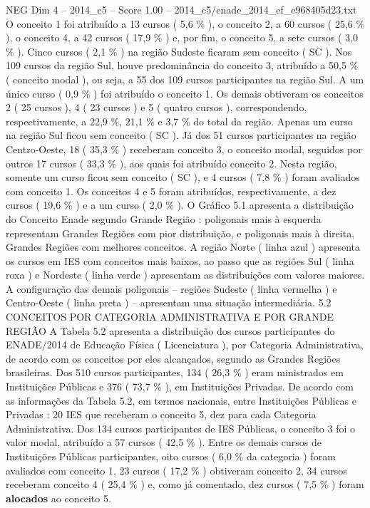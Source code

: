 \begin{textsample}{NEG Dim 4 – 2014\_c5 – Score 1.00 – 2014\_c5/enade\_2014\_ef\_e968405d23.txt}
O conceito 1 foi atribuído a 13 cursos ( 5,6 \% ), o conceito 2, a 60 cursos ( 25,6 \% ), o conceito 4, a 42 cursos ( 17,9 \% ) e, por fim, o conceito 5, a sete cursos ( 3,0 \% ).
Cinco cursos ( 2,1 \% ) na região Sudeste ficaram sem conceito ( SC ).
Nos 109 cursos da região Sul, houve predominância do conceito 3, atribuído a 50,5 \% ( conceito modal ), ou seja, a 55 dos 109 cursos participantes na região Sul.
A um único curso ( 0,9 \% ) foi atribuído o conceito 1.
Os demais obtiveram os conceitos 2 ( 25 cursos ), 4 ( 23 cursos ) e 5 ( quatro cursos ), correspondendo, respectivamente, a 22,9 \%, 21,1 \% e 3,7 \% do total da região.
Apenas um curso na região Sul ficou sem conceito ( SC ).
Já dos 51 cursos participantes na região Centro-Oeste, 18 ( 35,3 \% ) receberam conceito 3, o conceito modal, seguidos por outros 17 cursos ( 33,3 \% ), aos quais foi atribuído conceito 2.
Nesta região, somente um curso ficou sem conceito ( SC ), e 4 cursos ( 7,8 \% ) foram avaliados com conceito 1.
Os conceitos 4 e 5 foram atribuídos, respectivamente, a dez cursos ( 19,6 \% ) e a um curso ( 2,0 \% ).
O Gráfico 5.1 apresenta a distribuição do Conceito Enade segundo Grande Região : poligonais mais à esquerda representam Grandes Regiões com pior distribuição, e poligonais mais à direita, Grandes Regiões com melhores conceitos.
A região Norte ( linha azul ) apresenta os cursos em IES com conceitos mais baixos, ao passo que as regiões Sul ( linha roxa ) e Nordeste ( linha verde ) apresentam as distribuições com valores maiores.
A configuração das demais poligonais – regiões Sudeste ( linha vermelha ) e Centro-Oeste ( linha preta ) – apresentam uma situação intermediária. 5.2 CONCEITOS POR CATEGORIA ADMINISTRATIVA E POR GRANDE REGIÃO A Tabela 5.2 apresenta a distribuição dos cursos participantes do ENADE/2014 de Educação Física ( Licenciatura ), por Categoria Administrativa, de acordo com os conceitos por eles alcançados, segundo as Grandes Regiões brasileiras.
Dos 510 cursos participantes, 134 ( 26,3 \% ) eram ministrados em Instituições Públicas e 376 ( 73,7 \% ), em Instituições Privadas.
De acordo com as informações da Tabela 5.2, em termos nacionais, entre Instituições Públicas e Privadas : 20 IES que receberam o conceito 5, dez para cada Categoria Administrativa.
Dos 134 cursos participantes de IES Públicas, o conceito 3 foi o valor modal, atribuído a 57 cursos ( 42,5 \% ).
Entre os demais cursos de Instituições Públicas participantes, oito cursos ( 6,0 \% da categoria ) foram avaliados com conceito 1, 23 cursos ( 17,2 \% ) obtiveram conceito 2, 34 cursos receberam conceito 4 ( 25,4 \% ) e, como já comentado, dez cursos ( 7,5 \% ) foram \textbf{alocados} ao conceito 5.

\end{textsample}
